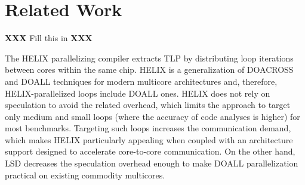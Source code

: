 \section{Related Work}

\textbf{XXX} Fill this in \textbf{XXX}

The HELIX parallelizing compiler extracts TLP by distributing loop iterations between cores within the same chip.
HELIX is a generalization of DOACROSS and DOALL techniques for modern multicore architectures and, therefore, HELIX-parallelized loops include DOALL ones.
HELIX does not rely on speculation to avoid the related overhead, which limits the approach to target only medium and small loops (where the accuracy of code analyses is higher) for most benchmarks.
Targeting such loops increases the communication demand, which makes HELIX particularly appealing when coupled with an architecture support designed to accelerate core-to-core communication.
On the other hand, LSD decreases the speculation overhead enough to make DOALL parallelization practical on existing commodity multicores.
